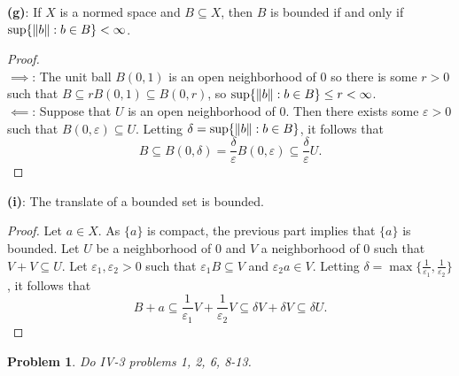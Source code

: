 \documentclass[12pt,letterpaper]{scrartcl}
\newcommand{\sub}{\subseteq}
\newcommand{\eps}{\varepsilon}
\theoremstyle{mystyle}
\newtheorem*{problem}{Problem}
\theoremstyle{plain}
\theoremstyle{remark}
\begin{document}
  \textbf{(g)}: If $X$ is a normed space and $B\sub X$, then $B$ is bounded if and only if $\sup\{\norm{b}: b\in B\}<\infty$.

  \begin{proof}\ \\
    \underline{$\implies$}: The unit ball $B(0,1)$ is an open neighborhood of $0$ so there is some $r>0$ such that $B \sub rB(0,1) \sub B(0,r)$, so $\sup\{\norm{b}: b\in B\}\leq r < \infty$.\\

    \underline{$\impliedby$}: Suppose that $U$ is an open neighborhood of $0$. Then there exists some $\eps > 0$ such that $B(0,\eps)\sub U$. Letting $\delta =\sup\{\norm{b}: b\in B\}$, it follows that
    \[
      B\sub B(0,\delta) = \frac{\delta}{\eps}B(0,\eps)\sub \frac{\delta}{\eps}U.
    \]

  \end{proof}

  \textbf{(i)}: The translate of a bounded set is bounded.

  \begin{proof}
    Let $a\in X$. As $\{a\}$ is compact, the previous part implies that $\{a\}$ is bounded. Let $U$ be a neighborhood of $0$ and $V$ a neighborhood of $0$ such that $V+V\sub U$. Let $\eps_1,\eps_2>0$ such that $\eps_1 B\sub V$ and $\eps_2 a\in V$. Letting $\delta = \max\{\frac{1}{\eps_1},\frac{1}{\eps_2}\}$, it follows that
    \[
      B+a \sub \frac{1}{\eps_1}V + \frac{1}{\eps_2}V \sub \delta V  + \delta V\sub \delta U.
    \]
  \end{proof}


\begin{problem}
  Do IV-3 problems 1, 2, 6, 8-13.
\end{problem}

\end{document}
